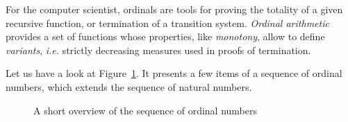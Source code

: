 For the computer scientist, ordinals are tools for proving the totality of a given recursive function, or termination of a transition system. \emph{Ordinal arithmetic} 
provides a set of functions whose properties, like \emph{monotony}, allow to define \emph{variants}, \emph{i.e.} strictly decreasing measures used in proofs of termination.

\vspace{4pt}

Let us have a look at Figure~\ref{fig:ordinal-sequence}. It presents a few items of a  sequence of ordinal numbers, which extends the sequence of natural numbers. 




\begin{figure}[h]
  \centering
{}
 
 
  \caption{A short overview of the sequence of ordinal numbers}
  \label{fig:ordinal-sequence}
\end{figure}


